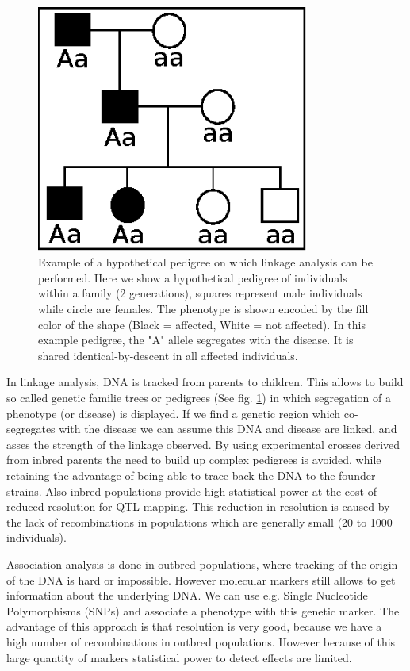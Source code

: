 \begin{figure}[h!]
 \centering
    \includegraphics[width=0.8\textwidth]{eps/image_1_2}
  \caption[Example of pedigree based linkage analysis.]
    {Example of a hypothetical pedigree on which linkage analysis can be performed. Here we show a 
    hypothetical pedigree of individuals within a family (2 generations), squares represent 
    male individuals while circle are females. The phenotype is shown encoded by the fill 
    color of the shape (Black = affected, White = not affected).  In this example pedigree, 
    the "A" allele segregates with the disease. It is shared identical-by-descent in all 
    affected individuals. }
    \label{fig:pedigree}
\end{figure}

In linkage analysis, DNA is tracked from parents to children. This allows to build so called 
genetic familie trees or pedigrees (See fig. \ref{fig:pedigree}) in which segregation of a phenotype (or 
disease) is displayed. If we find a genetic region which co-segregates with the disease we can assume this DNA and 
disease are linked, and asses the strength of the linkage observed. By using experimental 
crosses derived from inbred parents the need to build up complex pedigrees is avoided, while 
retaining the advantage of being able to trace back the DNA to the founder strains. Also inbred 
populations provide high statistical power at the cost of reduced resolution for QTL mapping. 
This reduction in resolution is caused by the lack of recombinations in populations which are 
generally small (20 to 1000 individuals).

Association analysis is done in outbred populations, where tracking of the origin of the 
DNA is hard or impossible. However molecular markers still allows to get information 
about the underlying DNA. We can use e.g. Single Nucleotide Polymorphisms (SNPs) and associate 
a phenotype with this genetic marker. The advantage of this approach is that resolution is 
very good, because we have a high number of recombinations in outbred populations. However 
because of this large quantity of markers statistical power to detect effects are limited.

